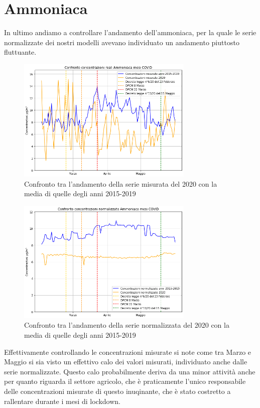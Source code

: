 \documentclass[a4paper]{report}
\begin{document}
\section{Ammoniaca}
In ultimo andiamo a controllare l'andamento dell'ammoniaca, per la quale le serie normalizzate dei nostri modelli avevano individuato un andamento piuttosto fluttuante.

\begin{figure}[h]
\centering
\includegraphics[width=0.75\textwidth]{ammoniaca_covid}
\caption{Confronto tra l'andamento della serie misurata del 2020 con la media di quelle degli anni 2015-2019}
\label{fig:ammoniaca_covid}
\end{figure}

\begin{figure}[h]
\centering
\includegraphics[width=0.75\textwidth]{ammoniaca_covid_norm}
\caption{Confronto tra l'andamento della serie normalizzata del 2020 con la media di quelle degli anni 2015-2019}
\label{fig:ammoniaca_covid_norm}
\end{figure}

Effettivamente controllando le concentrazioni misurate si note come tra Marzo e Maggio si sia visto un effettivo calo dei valori misurati, individuato anche dalle serie normalizzate.
Questo calo probabilmente deriva da una minor attività anche per quanto riguarda il settore agricolo, che è praticamente l'unico responsabile delle concentrazioni misurate di questo inuqinante, che è stato costretto a rallentare durante i mesi di lockdown.
\end{document}
